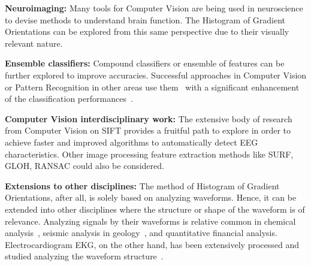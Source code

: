 \textbf{Neuroimaging:}
Many tools for Computer Vision are being used in neuroscience to devise methods to understand brain function.  The Histogram of Gradient Orientations can be explored from this same perspective due to their visually relevant nature.

\textbf{Ensemble classifiers:}
Compound classifiers or ensemble of features can be further explored to improve accuracies.  Successful approaches in Computer Vision or Pattern Recognition in other areas use them~\cite{Criminisi2013} with a significant enhancement of the classification performances~\cite{Gu2012}.

\textbf{Computer Vision interdisciplinary work:}
The extensive body of research from Computer Vision on SIFT provides a fruitful path to explore in order to achieve faster and improved algorithms to automatically detect EEG characteristics. Other image processing feature extraction methods like SURF, GLOH, RANSAC could also be considered.

\textbf{Extensions to other disciplines:}
The method of Histogram of Gradient Orientations, after all, is solely based on analyzing waveforms. Hence, it can be extended into other disciplines where the structure or shape of the waveform is of relevance.  Analyzing signals by their waveforms is relative common in chemical analysis~\cite{Skoog2000}, seismic analysis in geology~\cite{Owens1984}, and quantitative financial analysis.  Electrocardiogram EKG, on the other hand, has been extensively processed and studied analyzing the waveform structure~\cite{Stockman1976}.



%
